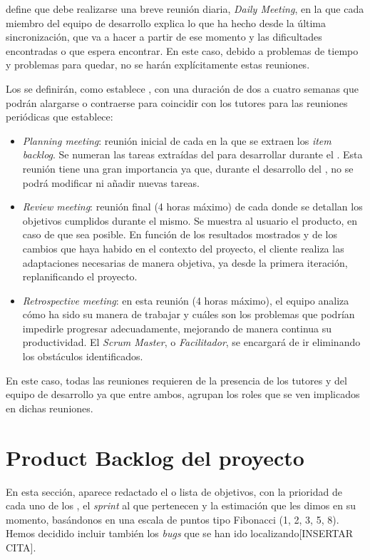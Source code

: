 
\scrum{} define que debe realizarse una breve reunión diaria, \textit{Daily Meeting}, en la que cada miembro del equipo de desarrollo explica lo que ha hecho desde la última sincronización, que va a hacer a partir de ese momento y las dificultades encontradas o que espera encontrar. En este caso, debido a problemas de tiempo y problemas para quedar, no se harán explícitamente estas reuniones.

Los \sprints{} se definirán, como establece \scrum{}, con una duración de dos a cuatro semanas que podrán alargarse o contraerse para coincidir con los tutores para las reuniones periódicas que establece:
\begin{itemize}
 \item \textit{Planning meeting}: reunión inicial de cada \sprint{} en la que se extraen los \textit{item backlog}. Se numeran las tareas extraídas del \productbacklog{} para desarrollar durante el \sprint{}. Esta reunión tiene una gran importancia ya que, durante el desarrollo del \sprint{}, no se podrá modificar ni añadir nuevas tareas.
 \item \textit{Review meeting}: reunión final (4 horas máximo) de cada \sprint{} donde se detallan los objetivos cumplidos durante el mismo. Se muestra al usuario el producto, en caso de que sea posible. En función de los resultados mostrados y de los cambios que haya habido en el contexto del proyecto, el cliente realiza las adaptaciones necesarias de manera objetiva, ya desde la primera iteración, replanificando el proyecto.
 \item \textit{Retrospective meeting}: en esta reunión (4 horas máximo), el equipo analiza cómo ha sido su manera de trabajar y cuáles son los problemas que podrían impedirle progresar adecuadamente, mejorando de manera continua su productividad. El \textit{Scrum Master}, o \textit{Facilitador}, se encargará de ir eliminando los obstáculos identificados.
\end{itemize}

En este caso, todas las reuniones requieren de la presencia de los tutores y del equipo de desarrollo ya que entre ambos, agrupan los roles que se ven implicados en dichas reuniones.
\newpage



\section{Product Backlog del proyecto}
En esta sección, aparece redactado el \productbacklog{}  o lista de objetivos, con la prioridad de cada uno de los \productitem{}, el \textit{sprint} al que pertenecen y la estimación que les dimos en su momento, basándonos en una escala de puntos tipo Fibonacci (1, 2, 3, 5, 8). Hemos decidido incluir también los \textit{bugs} que se han ido localizando[INSERTAR CITA].

